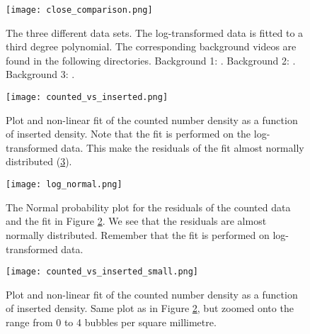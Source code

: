\begin{figure}[h]
  \centering
  \texttt{[image: close\_comparison.png]}
  \cprotect\caption{The three different data sets. The log-transformed data is fitted to a third degree polynomial. The corresponding background videos are found in the following directories. Background 1: . Background 2: . Background 3: .}
  \label{Fig:close comparison}
\end{figure}

\begin{figure}[h]
  \centering
  \texttt{[image: counted\_vs\_inserted.png]}
  \caption{Plot and non-linear fit of the counted number density as a function of inserted density. Note that the fit is performed on the log-transformed data. This make the residuals of the fit almost normally distributed (\ref{Fig:log_normal}).}
  \label{Fig:counted_vs_inserted_all}
\end{figure}

\begin{figure}[h]
	\centering
	\texttt{[image: log\_normal.png]}
	\caption{The Normal probability plot for the residuals of the counted data and the fit in Figure \ref{Fig:counted_vs_inserted_all}. We see that the residuals are almost normally distributed. Remember that the fit is performed on log-transformed data.}
	\label{Fig:log_normal}
\end{figure}

\begin{figure}[h]
  \centering
  \texttt{[image: counted\_vs\_inserted\_small.png]}
  \caption{Plot and non-linear fit of the counted number density as a function of inserted density. Same plot as in Figure \ref{Fig:counted_vs_inserted_all}, but zoomed onto the range from 0 to 4 bubbles per square millimetre.}
  \label{Fig:counted_vs_inserted_all_small}
\end{figure}

